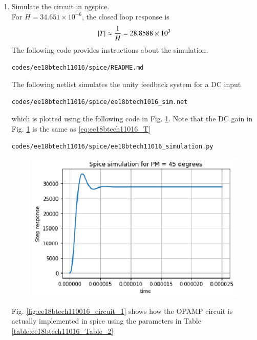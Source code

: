 \begin{enumerate}[label=\arabic*.,ref=\theenumi]
\item Simulate the circuit in ngspice.\\
\solution For $H=34.651\times10^{-6}$, the closed loop response is
\begin{align}
\abs T \approx \frac{1}{H} = 28.8588\times10^{3}
\label{eq:ee18btech11016_T}
\end{align}
The following code provides instructions about the simulation.
\begin{lstlisting}
codes/ee18btech11016/spice/README.md
\end{lstlisting}
%
The following netlist simulates the unity feedback system for a DC input
%
\begin{lstlisting}
codes/ee18btech11016/spice/ee18btech1016_sim.net
\end{lstlisting}
which is plotted using the following code in Fig. \ref{fig:ee18btech11016_spice}.  Note that the DC gain in Fig. \ref{fig:ee18btech11016_spice} is the same as \eqref{eq:ee18btech11016_T}

 \begin{lstlisting}
codes/ee18btech11016/spice/ee18btech11016_simulation.py
\end{lstlisting}
\renewcommand{\thefigure}{\theenumi.\arabic{figure}}
\begin{figure}[!h]
\centering
\includegraphics[width=\columnwidth]{./figs/ee18btech11016/ee18btech11016_spice.eps}
\caption{}
\label{fig:ee18btech11016_spice}
\end{figure}

Fig. \ref{fig:ee18btech110016_circuit_1} shows how the OPAMP circuit is actually implemented in spice using the parameters in Table \ref{table:ee18btech11016_Table_2}  


\end{enumerate}

